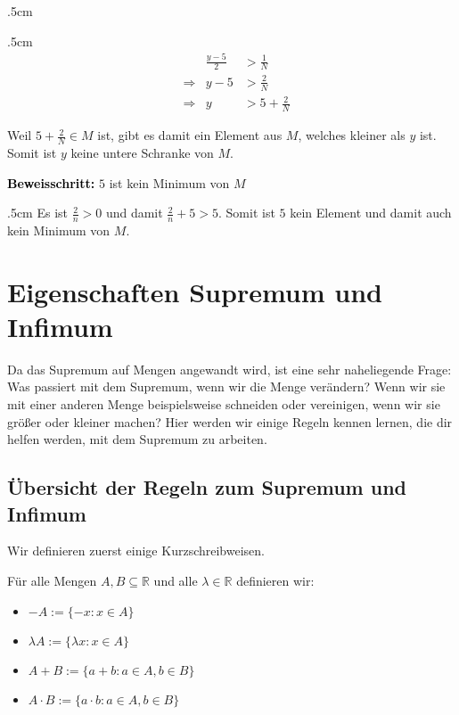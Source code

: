\documentclass[fontsize=9pt,
               parskip=half-,
               DIV=14,
               listof=chapterentry,
               tocflat]{scrbook}
\newenvironment{indentblock}{\begin{adjustwidth}{.5cm}{}}{\end{adjustwidth}}
\newcommand{\proofstep}[1]{\textbf{\textcolor{Black}{#1}}}
\begin{document}
\begin{proof*}
\begin{indentblock}
\begin{indentblock}
\begin{align*}
&&{\tfrac {y-5}{2}}&>{\tfrac {1}{N}}\\&\Rightarrow &y-5&>{\tfrac {2}{N}}\\&\Rightarrow &y&>5+{\tfrac {2}{N}}
\end{align*}

Weil $5+{\tfrac {2}{N}}\in M$ ist, gibt es damit ein Element aus $M$, welches kleiner als $y$ ist. Somit ist $y$ keine untere Schranke von $M$.

\end{indentblock}

\end{indentblock}

\proofstep{Beweisschritt:}
 $5$ ist kein Minimum von $M$\begin{indentblock}
Es ist ${\tfrac {2}{n}}>0$ und damit ${\tfrac {2}{n}}+5>5$. Somit ist $5$ kein Element und damit auch kein Minimum von $M$.

\end{indentblock}

\end{proof*}



\chapter{Eigenschaften Supremum und Infimum}

Da das Supremum auf Mengen angewandt wird, ist eine sehr naheliegende Frage: Was passiert mit dem Supremum, wenn wir die Menge verändern? Wenn wir sie mit einer anderen Menge beispielsweise schneiden oder vereinigen, wenn wir sie größer oder kleiner machen? Hier werden wir einige Regeln kennen lernen, die dir helfen werden, mit dem Supremum zu arbeiten.

\section{Übersicht der Regeln zum Supremum und Infimum}

Wir definieren zuerst einige Kurzschreibweisen.

\begin{definition*}
Für alle Mengen $A,B\subseteq \mathbb {R} $ und alle $\lambda \in \mathbb {R} $ definieren wir:

\begin{itemize}
\item $-A:=\{-x:x\in A\}$
\item $\lambda A:=\{\lambda x:x\in A\}$
\item $A+B:=\{a+b:a\in A,b\in B\}$
\item $A\cdot B:=\{a\cdot b:a\in A,b\in B\}$
\end{itemize}

\end{definition*}
\end{document}
